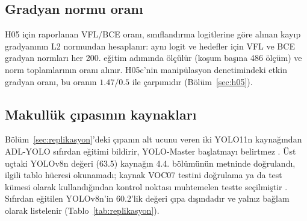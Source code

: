 \subsection{Gradyan normu oranı}\label{sec:ek-gradyan}
H05 için raporlanan VFL/BCE oranı, sınıflandırma logitlerine göre alınan kayıp gradyanının L2 normundan hesaplanır: aynı logit ve hedefler için VFL ve BCE gradyan normları her 200. eğitim adımında ölçülür (koşum başına 486 ölçüm) ve norm toplamlarının oranı alınır. H05c'nin manipülasyon denetimindeki etkin gradyan oranı, bu oranın $1.47/0.5$ ile çarpımıdır (Bölüm~\ref{sec:h05}).

\subsection{Makullük çıpasının kaynakları}\label{sec:ek-cipa}
Bölüm~\ref{sec:replikasyon}'deki çıpanın alt ucunu veren iki YOLO11n kaynağından ADL-YOLO sıfırdan eğitimi bildirir, YOLO-Master başlatmayı belirtmez \cite{zhang_2025_adlyolo,lin_2025_yolomaster}. Üst uçtaki YOLOv8n değeri (63.5) kaynağın 4.4. bölümünün metninde doğrulandı, ilgili tablo hücresi okunamadı; kaynak VOC07 testini doğrulama ya da test kümesi olarak kullandığından kontrol noktası muhtemelen testte seçilmiştir \cite{elhamdouni_2025_yolov8nvoc}. Sıfırdan eğitilen YOLOv8n'in 60.2'lik değeri çıpa dışındadır ve yalnız bağlam olarak listelenir (Tablo~\ref{tab:replikasyon}).
